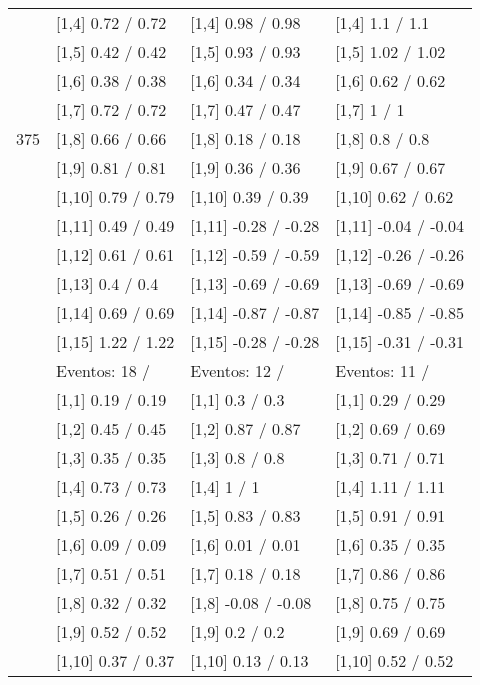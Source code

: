 \begin{table}
\begin{tabular}[t]{llll}
\addlinespace
 & {}[1,4] 0.72  / 0.72 & {}[1,4] 0.98  / 0.98 & {}[1,4] 1.1  / 1.1\\
 & {}[1,5] 0.42  / 0.42 & {}[1,5] 0.93  / 0.93 & {}[1,5] 1.02  / 1.02\\
 & {}[1,6] 0.38  / 0.38 & {}[1,6] 0.34  / 0.34 & {}[1,6] 0.62  / 0.62\\
 & {}[1,7] 0.72  / 0.72 & {}[1,7] 0.47  / 0.47 & {}[1,7] 1  / 1\\
375 & {}[1,8] 0.66  / 0.66 & {}[1,8] 0.18  / 0.18 & {}[1,8] 0.8  / 0.8\\
\addlinespace
 & {}[1,9] 0.81  / 0.81 & {}[1,9] 0.36  / 0.36 & {}[1,9] 0.67  / 0.67\\
 & {}[1,10] 0.79  / 0.79 & {}[1,10] 0.39  / 0.39 & {}[1,10] 0.62  / 0.62\\
 & {}[1,11] 0.49  / 0.49 & {}[1,11] -0.28  / -0.28 & {}[1,11] -0.04  / -0.04\\
 & {}[1,12] 0.61  / 0.61 & {}[1,12] -0.59  / -0.59 & {}[1,12] -0.26  / -0.26\\
 & {}[1,13] 0.4  / 0.4 & {}[1,13] -0.69  / -0.69 & {}[1,13] -0.69  / -0.69\\
\addlinespace
 & {}[1,14] 0.69  / 0.69 & {}[1,14] -0.87  / -0.87 & {}[1,14] -0.85  / -0.85\\
 & {}[1,15] 1.22  / 1.22 & {}[1,15] -0.28  / -0.28 & {}[1,15] -0.31  / -0.31\\
 & Eventos:  18 / & Eventos:  12 / & Eventos:  11 /\\
 & {}[1,1] 0.19  / 0.19 & {}[1,1] 0.3  / 0.3 & {}[1,1] 0.29  / 0.29\\
 & {}[1,2] 0.45  / 0.45 & {}[1,2] 0.87  / 0.87 & {}[1,2] 0.69  / 0.69\\
\addlinespace
 & {}[1,3] 0.35  / 0.35 & {}[1,3] 0.8  / 0.8 & {}[1,3] 0.71  / 0.71\\
 & {}[1,4] 0.73  / 0.73 & {}[1,4] 1  / 1 & {}[1,4] 1.11  / 1.11\\
 & {}[1,5] 0.26  / 0.26 & {}[1,5] 0.83  / 0.83 & {}[1,5] 0.91  / 0.91\\
 & {}[1,6] 0.09  / 0.09 & {}[1,6] 0.01  / 0.01 & {}[1,6] 0.35  / 0.35\\
 & {}[1,7] 0.51  / 0.51 & {}[1,7] 0.18  / 0.18 & {}[1,7] 0.86  / 0.86\\
\addlinespace
500 & {}[1,8] 0.32  / 0.32 & {}[1,8] -0.08  / -0.08 & {}[1,8] 0.75  / 0.75\\
 & {}[1,9] 0.52  / 0.52 & {}[1,9] 0.2  / 0.2 & {}[1,9] 0.69  / 0.69\\
 & {}[1,10] 0.37  / 0.37 & {}[1,10] 0.13  / 0.13 & {}[1,10] 0.52  / 0.52\\

\end{tabular}
\end{table}
